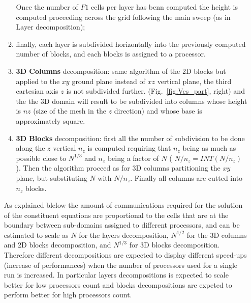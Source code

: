 \begin{enumerate}
\begin{enumerate}
Once the number of $F1$ cells per layer has benn computed the height is computed 
proceeding across the grid following the main sweep (as in Layer decomposition);
\item finally, each layer is subdivided horizontally into the previously computed number
of blocks, and each blocks is assigned to a processor. 
\item {\bf 3D Columns } decomposition: same algorithm of the 2D blocks but applied to the $xy$ 
ground plane instead of $xz$ vertical plane, the third cartesian axis $z$ is not subdivided
further. (Fig.~\ref{fig:Ves_part}, right) and the the 3D domain will result to be subdivided
into columns whose height is $nz$ (size of the mesh in the $z$ direction) and whose base
is approximately square.
\item {\bf 3D Blocks} decomposition: first all the number of subdivision to be done
along the $z$ vertical $n_z$ is computed requiring that $n_z$ being as much as possible
close to $N^{1/3}$ and $n_z$ being a factor of $N$ ( $N/n_z = INT(N/n_z)$ ).
Then the algorithm proceed as for 3D columns partitioning the $xy$ plane, 
but substituting $N$ with $N/n_z$. Finally all columns are cutted into $n_z$ blocks.
\end{enumerate}

As explained blelow the amount of communications required for the solution 
of the constituent equations
are proportional to the cells that are at the boundary between sub-domains assigned to
different processors, and can be estimated to scale as $N$ for the layers decomposition, 
$N^{1/2}$ for the 3D columns
and 2D blocks decomposition, and $N^{1/3}$ for 3D blocks decomposition.\\
Therefore different decompositions are expected to display different speed-ups
(increase of performances) when the number of processors used for a single run
is increased. In particular layers decompositions is expected to scale better
for low processors count and blocks decompositions are expeted to perform 
better for high processors count.


\end{enumerate}
